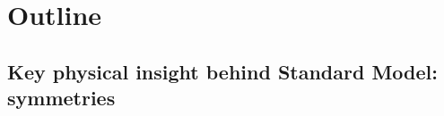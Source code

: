

\chapter{Outline}
\setcounter{theorem}{0}
\setcounter{equation}{0}


\renewcommand{\theenumi}{\roman{enumi}}
\renewcommand{\labelenumi}{\textnormal{(\theenumi)}$\;\;$}


\section{Key physical insight behind Standard Model: symmetries}

